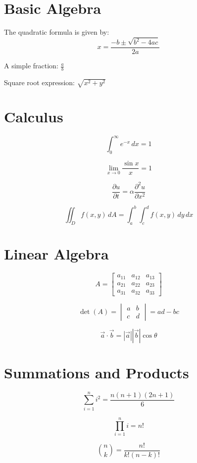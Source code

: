 \documentclass{article}
\begin{document}
\section{Basic Algebra}

The quadratic formula is given by:
$$x = \frac{-b \pm \sqrt{b^2 - 4ac}}{2a}$$

A simple fraction: $\frac{a}{b}$

Square root expression: $\sqrt{x^2 + y^2}$

\section{Calculus}

$$\int_{0}^{\infty} e^{-x} \, dx = 1$$

$$\lim_{x \to 0} \frac{\sin x}{x} = 1$$

$$\frac{\partial u}{\partial t} = \alpha \frac{\partial^2 u}{\partial x^2}$$

$$\iint_D f(x,y) \, dA = \int_a^b \int_c^d f(x,y) \, dy \, dx$$

\section{Linear Algebra}

$$A = \begin{bmatrix}
a_{11} & a_{12} & a_{13} \\
a_{21} & a_{22} & a_{23} \\
a_{31} & a_{32} & a_{33}
\end{bmatrix}$$

$$\det(A) = \begin{vmatrix}
a & b \\
c & d
\end{vmatrix} = ad - bc$$

$$\vec{a} \cdot \vec{b} = |\vec{a}||\vec{b}|\cos\theta$$

\section{Summations and Products}

$$\sum_{i=1}^{n} i^2 = \frac{n(n+1)(2n+1)}{6}$$

$$\prod_{i=1}^{n} i = n!$$

$$\binom{n}{k} = \frac{n!}{k!(n-k)!}$$
\end{document}
